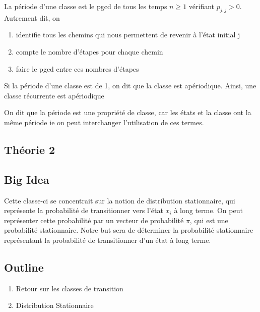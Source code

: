 \documentclass{article}
\begin{document}
\begin{definition}
    La période d'une classe est le pgcd de tous les temps $n \geq 1$
    vérifiant $p_{j,j} >0$. Autrement dit, on
    \begin{enumerate}
        \item identifie tous les chemins qui nous permettent de revenir
	    à l'état initial j
	\item compte le nombre d'étapes pour chaque chemin
	\item faire le pgcd entre ces nombres d'étapes
    \end{enumerate}
\end{definition}

\begin{remark}
    Si la période d'une classe est de 1, on dit que la classe est
    apériodique. Ainsi, une classe récurrente est apériodique
\end{remark}

\begin{remark}
    On dit que la période est une propriété de classe, car les états
    et la classe ont la même période ie on peut interchanger l'utilisation
    de ces termes.
\end{remark}

\subsection{Théorie 2}
\subsection*{Big Idea}

Cette classe-ci se concentrait sur la notion de distribution stationnaire, qui
représente la probabilité de transitionner vers l'état $x_i$ à long terme.
On peut représenter cette probabilité par un vecteur de probabilité $\pi$, qui
est une probabilité stationnaire. Notre but sera de déterminer la probabilité
stationnaire représentant la probabilité de transitionner d'un état à long terme.

\subsection*{Outline}
\begin{enumerate}
    \item Retour sur les classes de transition
    \item Distribution Stationnaire
\end{enumerate}
\end{document}

